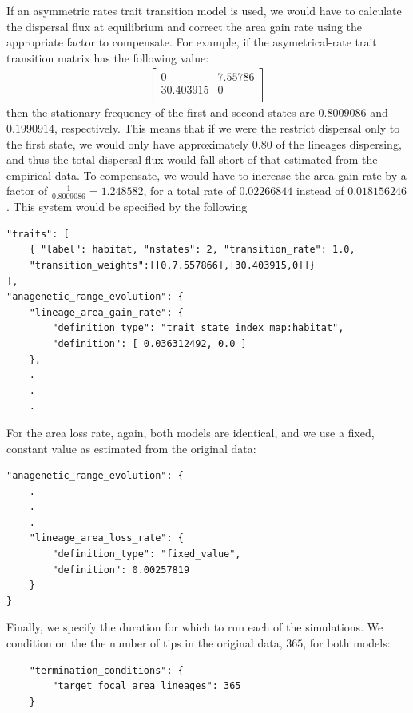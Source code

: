 \documentclass[11pt,openany]{memoir} %
\begin{document}
If an asymmetric rates trait transition model is used, we would have to calculate the dispersal flux at equilibrium and correct the area gain rate using the appropriate factor to compensate.
For example, if the asymetrical-rate trait transition matrix has the following value:
\begin{align*}
\begin{bmatrix}
    0         &  7.55786 \\
    30.403915 & 0        \\
\end{bmatrix}
\end{align*}
then the stationary frequency of the first and second states are $0.8009086$ and $0.1990914$, respectively.
This means that if we were the restrict dispersal only to the first state, we would only have approximately $0.80$ of the lineages dispersing, and thus the total dispersal flux would fall short of that estimated from the empirical data.
To compensate, we would have to increase the area gain rate by a factor of $\frac{1}{0.8009086}=1.248582$, for a total rate of $0.02266844$ instead of $0.018156246$.
This system would be specified by the following
\begin{lstlisting}
"traits": [
    { "label": habitat, "nstates": 2, "transition_rate": 1.0,
    "transition_weights":[[0,7.557866],[30.403915,0]]}
],
"anagenetic_range_evolution": {
    "lineage_area_gain_rate": {
        "definition_type": "trait_state_index_map:habitat",
        "definition": [ 0.036312492, 0.0 ]
    },
    .
    .
    .
\end{lstlisting}

For the area loss rate, again, both models are identical, and we use a fixed, constant value as estimated from the original data:
\begin{lstlisting}
"anagenetic_range_evolution": {
    .
    .
    .
    "lineage_area_loss_rate": {
        "definition_type": "fixed_value",
        "definition": 0.00257819
    }
}
\end{lstlisting}

Finally, we specify the duration for which to run each of the simulations.
We condition on the the number of tips in the original data, $365$, for both models:
\begin{lstlisting}
    "termination_conditions": {
        "target_focal_area_lineages": 365
    }
\end{lstlisting}
\end{document}
